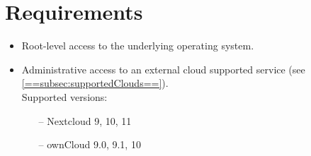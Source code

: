 \section{Requirements}
\begin{itemize}
    \item Root-level access to the underlying operating system.
    \item Administrative access to an external cloud supported service (see \ref{==subsec:supportedClouds==}).\\
    Supported versions:
    \begin{itemize}
        \item[--] Nextcloud 9, 10, 11
        \item[--] ownCloud 9.0, 9.1, 10
    \end{itemize}
\end{itemize}